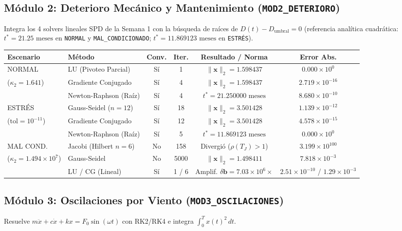 \documentclass[11pt,a4paper]{article}
\begin{document}
\subsection{Módulo 2: Deterioro Mecánico y Mantenimiento (\texttt{MOD2\_DETERIORO})}
Integra los 4 solvers lineales SPD de la Semana 1 con la búsqueda de raíces de $D(t)-D_{\text{umbral}}=0$ (referencia analítica cuadrática: $t^*=21.25\text{ meses}$ en \texttt{NORMAL} y \texttt{MAL\_CONDICIONADO}; $t^*=11.869123\text{ meses}$ en \texttt{ESTRÉS}).

\begin{table}[h!]
\centering
\small
\begin{tabular}{llcccc}
\toprule
\textbf{Escenario} & \textbf{Método} & \textbf{Conv.} & \textbf{Iter.} & \textbf{Resultado / Norma} & \textbf{Error Abs.} \\
\midrule
NORMAL & LU (Pivoteo Parcial) & Sí & 1 & $\|\mathbf{x}\|_2=1.598437$ & $0.000\times 10^{0}$ \\
($\kappa_2=1.641$) & Gradiente Conjugado & Sí & 4 & $\|\mathbf{x}\|_2=1.598437$ & $2.719\times 10^{-16}$ \\
 & Newton-Raphson (Raíz) & Sí & 4 & $t^*=21.250000\text{ meses}$ & $8.680\times 10^{-10}$ \\
\midrule
ESTRÉS & Gauss-Seidel ($n=12$) & Sí & 18 & $\|\mathbf{x}\|_2=3.501428$ & $1.139\times 10^{-12}$ \\
($\text{tol}=10^{-11}$) & Gradiente Conjugado & Sí & 12 & $\|\mathbf{x}\|_2=3.501428$ & $4.578\times 10^{-15}$ \\
 & Newton-Raphson (Raíz) & Sí & 5 & $t^*=11.869123\text{ meses}$ & $0.000\times 10^{0}$ \\
\midrule
MAL COND. & Jacobi (Hilbert $n=6$) & No & 158 & Divergió ($\rho(T_J)>1$) & $3.199\times 10^{100}$ \\
($\kappa_2=1.494\times 10^7$) & Gauss-Seidel & No & 5000 & $\|\mathbf{x}\|_2=1.498411$ & $7.818\times 10^{-3}$ \\
 & LU / CG (Lineal) & Sí & 1 / 6 & Amplif. $\delta\mathbf{b}=7.03\times 10^6\times$ & $2.51\times 10^{-10}$ / $1.29\times 10^{-3}$ \\
\bottomrule
\end{tabular}
\end{table}

\subsection{Módulo 3: Oscilaciones por Viento (\texttt{MOD3\_OSCILACIONES})}
Resuelve $m\ddot{x}+c\dot{x}+kx=F_0\sin(\omega t)$ con RK2/RK4 e integra $\int_0^T x(t)^2\,dt$.
\end{document}
